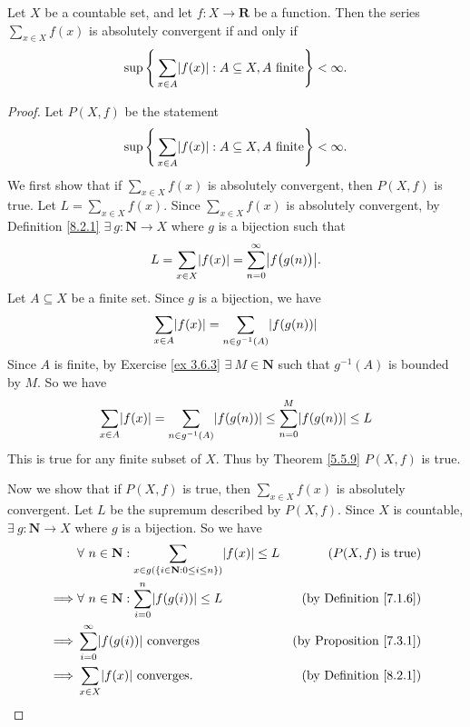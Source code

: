 \begin{lemma}\label{8.2.3}
    Let \(X\) be a countable set, and let \(f : X \to \mathbf{R}\) be a function.
    Then the series \(\sum_{x \in X} f(x)\) is absolutely convergent if and only if
    \[
        \sup\Bigg\{\sum_{x \in A} \abs*{f(x)} : A \subseteq X, A \text{ finite}\Bigg\} < \infty.
    \]
\end{lemma}

\begin{proof}
    Let \(P(X, f)\) be the statement
    \[
        \sup\Bigg\{\sum_{x \in A} \abs*{f(x)} : A \subseteq X, A \text{ finite}\Bigg\} < \infty.
    \]
    We first show that if \(\sum_{x \in X} f(x)\) is absolutely convergent, then \(P(X, f)\) is true.
    Let \(L = \sum_{x \in X} f(x)\).
    Since \(\sum_{x \in X} f(x)\) is absolutely convergent, by Definition \ref{8.2.1} \(\exists\ g : \mathbf{N} \to X\) where \(g\) is a bijection such that
    \[
        L = \sum_{x \in X} \abs*{f(x)} = \sum_{n = 0}^\infty \abs*{f\big(g(n)\big)}.
    \]
    Let \(A \subseteq X\) be a finite set.
    Since \(g\) is a bijection, we have
    \[
        \sum_{x \in A} \abs*{f(x)} = \sum_{n \in g^{-1}(A)} \abs*{f(g(n))}
    \]
    Since \(A\) is finite, by Exercise \ref{ex 3.6.3} \(\exists\ M \in \mathbf{N}\) such that \(g^{-1}(A)\) is bounded by \(M\).
    So we have
    \[
        \sum_{x \in A} \abs*{f(x)} = \sum_{n \in g^{-1}(A)} \abs*{f(g(n))} \leq \sum_{n = 0}^M \abs*{f(g(n))} \leq L
    \]
    This is true for any finite subset of \(X\).
    Thus by Theorem \ref{5.5.9} \(P(X, f)\) is true.

    Now we show that if \(P(X, f)\) is true, then \(\sum_{x \in X} f(x)\) is absolutely convergent.
    Let \(L\) be the supremum described by \(P(X, f)\).
    Since \(X\) is countable, \(\exists\ g : \mathbf{N} \to X\) where \(g\) is a bijection.
    So we have
    \begin{align*}
                 & \forall\ n \in \mathbf{N} : \sum_{x \in g(\{i \in \mathbf{N} : 0 \leq i \leq n\})} \abs*{f(x)} \leq L & (P(X, f) \text{ is true})           \\
        \implies & \forall\ n \in \mathbf{N} : \sum_{i = 0}^n \abs*{f(g(i))} \leq L                                      & \text{(by Definition \ref{7.1.6})}  \\
        \implies & \sum_{i = 0}^\infty \abs*{f(g(i))} \text{ converges}                                                  & \text{(by Proposition \ref{7.3.1})} \\
        \implies & \sum_{x \in X} \abs*{f(x)} \text{ converges}.                                                         & \text{(by Definition \ref{8.2.1})}
    \end{align*}
\end{proof}

